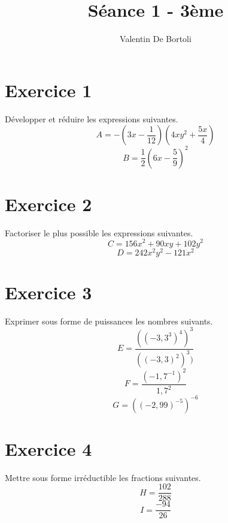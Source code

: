 \documentclass[10pt,a4paper]{article}
\title{Séance 1 - 3ème}
\author{Valentin De Bortoli}
\begin{document}
\maketitle
\section{Exercice 1}
Développer et réduire les expressions suivantes.
\begin{equation}
A=-(3x-\frac{1}{12})(4xy^2+\frac{5x}{4})
\end{equation}
\begin{equation}
B=\frac{1}{2}(6x-\frac{5}{9})^2
\end{equation}
\section{Exercice 2}
Factoriser le plus possible les expressions suivantes.
\begin{equation}
C=156x^2+90xy+102y^2
\end{equation}
\begin{equation}
D=242x^2y^2-121x^2
\end{equation}
\section{Exercice 3}
Exprimer sous forme de puissances les nombres suivants.
\begin{equation}
E=\frac{((-3,3^3)^4)^3}{((-3,3)^2)^3)}
\end{equation}
\begin{equation}
F=\frac{(-1,7^{-1})^2}{1,7^2}
\end{equation}
\begin{equation}
G=((-2,99)^{-5})^{-6}
\end{equation}
\section{Exercice 4}
Mettre sous forme irréductible les fractions suivantes.
\begin{equation}
H=\frac{102}{288}
\end{equation}
\begin{equation}
I=\frac{-94}{26}
\end{equation}
\end{document}
